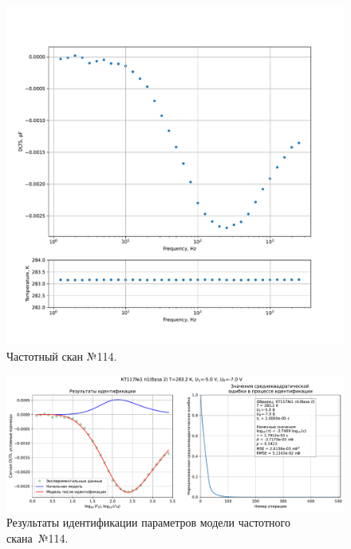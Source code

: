 \begin{figure}[!ht]
    \centering
    \includegraphics[width=1\textwidth]{../plots/КТ117№1_п1(база 2)_2500Гц-1Гц_1пФ_+10С_-5В-7В_50мВ_20мкс_шаг_0,1.pdf}
    \caption{Частотный скан №114.}
    \label{pic:frequency_scan_114}
\end{figure}

\begin{figure}[!ht]
    \centering
    \includegraphics[width=1\textwidth]{../plots/КТ117№1_п1(база 2)_2500Гц-1Гц_1пФ_+10С_-5В-7В_50мВ_20мкс_шаг_0,1_model.pdf}
    \caption{Результаты идентификации параметров модели частотного скана~№114.}
    \label{pic:frequency_scan_model114}
\end{figure}

\pagebreak


